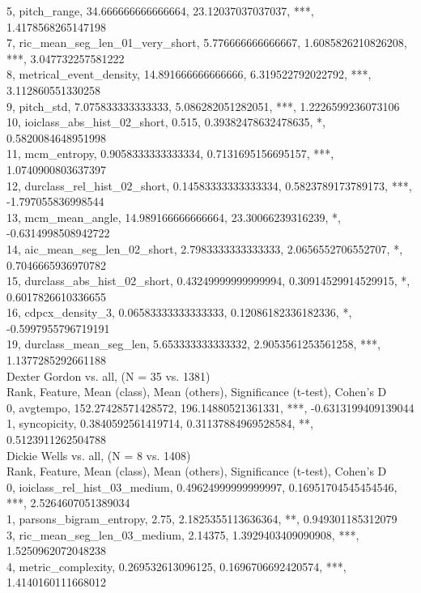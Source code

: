 5, pitch_range, 34.666666666666664, 23.12037037037037, ***, 1.4178568265147198\\
7, ric_mean_seg_len_01_very_short, 5.776666666666667, 1.6085826210826208, ***, 3.047732257581222\\
8, metrical_event_density, 14.891666666666666, 6.319522792022792, ***, 3.112860551330258\\
9, pitch_std, 7.075833333333333, 5.086282051282051, ***, 1.2226599236073106\\
10, ioiclass_abs_hist_02_short, 0.515, 0.39382478632478635, *, 0.5820084648951998\\
11, mcm_entropy, 0.9058333333333334, 0.7131695156695157, ***, 1.0740900803637397\\
12, durclass_rel_hist_02_short, 0.14583333333333334, 0.5823789173789173, ***, -1.797055836998544\\
13, mcm_mean_angle, 14.989166666666664, 23.30066239316239, *, -0.6314998508942722\\
14, aic_mean_seg_len_02_short, 2.7983333333333333, 2.0656552706552707, *, 0.7046665936970782\\
15, durclass_abs_hist_02_short, 0.43249999999999994, 0.30914529914529915, *, 0.6017826610336655\\
16, cdpcx_density_3, 0.06583333333333333, 0.12086182336182336, *, -0.5997955796719191\\
19, durclass_mean_seg_len, 5.653333333333332, 2.9053561253561258, ***, 1.1377285292661188\\
Dexter Gordon vs. all, (N = 35 vs. 1381)\\
Rank, Feature, Mean (class), Mean (others), Significance (t-test), Cohen's D\\
0, avgtempo, 152.27428571428572, 196.14880521361331, ***, -0.6313199409139044\\
1, syncopicity, 0.3840592561419714, 0.31137884969528584, **, 0.5123911262504788\\
Dickie Wells vs. all, (N = 8 vs. 1408)\\
Rank, Feature, Mean (class), Mean (others), Significance (t-test), Cohen's D\\
0, ioiclass_rel_hist_03_medium, 0.49624999999999997, 0.16951704545454546, ***, 2.5264607051389034\\
1, parsons_bigram_entropy, 2.75, 2.1825355113636364, **, 0.949301185312079\\
3, ric_mean_seg_len_03_medium, 2.14375, 1.3929403409090908, ***, 1.5250962072048238\\
4, metric_complexity, 0.269532613096125, 0.1696706692420574, ***, 1.4140160111668012\\

